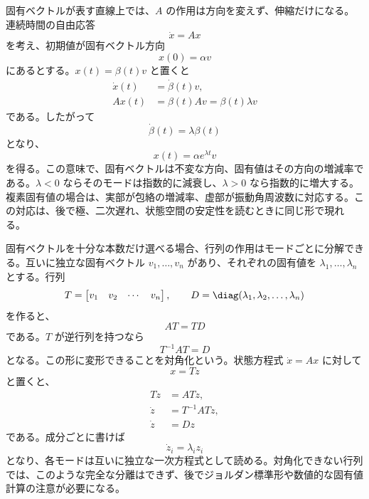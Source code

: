 固有ベクトルが表す直線上では、$A$ の作用は方向を変えず、伸縮だけになる。連続時間の自由応答
\begin{equation}
  \dot{x}=Ax
\end{equation}
を考え、初期値が固有ベクトル方向
\begin{equation}
  x(0)=\alpha v
\end{equation}
にあるとする。$x(t)=\beta(t)v$ と置くと
\begin{align}
  \dot{x}(t)&=\dot{\beta}(t)v,\\
  Ax(t)&=\beta(t)Av
    =\beta(t)\lambda v
\end{align}
である。したがって
\begin{equation}
  \dot{\beta}(t)=\lambda\beta(t)
\end{equation}
となり、
\begin{equation}
  x(t)=\alpha e^{\lambda t}v
\end{equation}
を得る。この意味で、固有ベクトルは不変な方向、固有値はその方向の増減率である。$\lambda<0$ ならそのモードは指数的に減衰し、$\lambda>0$ なら指数的に増大する。複素固有値の場合は、実部が包絡の増減率、虚部が振動角周波数に対応する。この対応は、後で極、二次遅れ、状態空間の安定性を読むときに同じ形で現れる。

固有ベクトルを十分な本数だけ選べる場合、行列の作用はモードごとに分解できる。互いに独立な固有ベクトル $v_1,\ldots,v_n$ があり、それぞれの固有値を $\lambda_1,\ldots,\lambda_n$ とする。行列
\begin{equation}
  T=\begin{bmatrix}v_1&v_2&\cdots&v_n\end{bmatrix},
  \qquad
  D=\diag(\lambda_1,\lambda_2,\ldots,\lambda_n)
\end{equation}
を作ると、
\begin{equation}
  AT=TD
\end{equation}
である。$T$ が逆行列を持つなら
\begin{equation}
  T^{-1}AT=D
\end{equation}
となる。この形に変形できることを対角化という。状態方程式 $\dot{x}=Ax$ に対して
\begin{equation}
  x=Tz
\end{equation}
と置くと、
\begin{align}
  T\dot{z}&=ATz,\\
  \dot{z}&=T^{-1}ATz,\\
  \dot{z}&=Dz
\end{align}
である。成分ごとに書けば
\begin{equation}
  \dot{z}_i=\lambda_i z_i
\end{equation}
となり、各モードは互いに独立な一次方程式として読める。対角化できない行列では、このような完全な分離はできず、後でジョルダン標準形や数値的な固有値計算の注意が必要になる。

